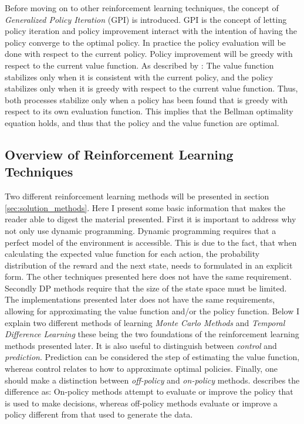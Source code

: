  Before moving on to other reinforcement learning techniques, the concept of \textit{Generalized Policy Iteration} (GPI) is introduced. GPI is the concept of letting policy iteration and policy improvement interact with the intention of having the policy converge to the optimal policy. In practice the policy evaluation will be done with respect to the current policy. Policy improvement will be greedy with respect to the current value function. As described by \textcite{sutton_reinforcement_2018}: The value function stabilizes only when it is consistent with the current policy, and the policy stabilizes
only when it is greedy with respect to the current value function.
Thus, both processes stabilize only when a policy has been found that is greedy with respect to its own evaluation function. This implies that the Bellman optimality equation holds, and thus that the policy and the value function are optimal.
 
 \subsection{Overview of Reinforcement Learning Techniques}
 
Two different reinforcement learning methods will be presented in section \ref{sec:solution_methods}. Here I present some basic information that makes the reader able to digest the material presented. First it is important to address why not only use dynamic programming. Dynamic programming requires that a perfect model of the environment is accessible. This is due to the fact, that when calculating the expected value function for each action, the probability distribution of the reward and the next state, needs to formulated in an explicit form. The other techniques presented here does not have the same requirement. Secondly DP methods require that the size of the state space must be limited. The implementations presented later does not have the same requirements, allowing for approximating the value function and/or the policy function. Below I explain two different methods of learning \textit{Monte Carlo Methods} and \textit{Temporal Difference Learning} these being the two foundations of the reinforcement learning methods presented later. It is also useful to distinguish between \textit{control} and \textit{prediction}. Prediction can be considered the step of estimating the value function, whereas control relates to how to approximate optimal policies. Finally, one should make a distinction between \textit{off-policy} and \textit{on-policy} methods. \textcite{sutton_reinforcement_2018} describes the difference as: On-policy methods attempt to evaluate or improve the policy that is used to make decisions, whereas off-policy methods evaluate or improve a policy different from that used to generate the data.

